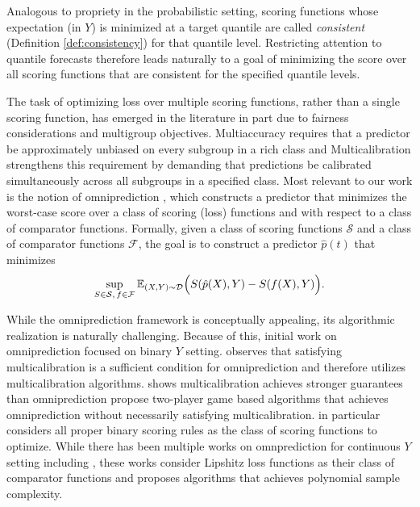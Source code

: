 Analogous to propriety in the probabilistic setting, scoring functions whose expectation (in $Y$) is minimized at a target quantile are called \emph{consistent} (Definition \ref{def:consistency}) for that quantile level. Restricting attention to quantile forecasts therefore leads naturally to a goal of minimizing the score over all scoring functions that are consistent for the specified quantile levels.

The task of optimizing loss over multiple scoring functions, rather than a single scoring function, has emerged in the literature in part due to fairness considerations and multigroup objectives. Multiaccuracy \cite{hebert2018multicalibration, kim2019multiaccuracy} requires that a predictor be approximately unbiased on every subgroup in a rich class and 
Multicalibration \cite{hebert2018multicalibration} strengthens this requirement by demanding that predictions be calibrated simultaneously across all subgroups in a specified class. Most relevant to our work is the notion of omniprediction \cite{gopalan2022omnipredictors}, which constructs a predictor that minimizes the worst-case score over a class of scoring (loss) functions and with respect to a class of comparator functions. Formally, given a class of scoring functions $\mathcal{S}$ and a class of comparator functions $\mathcal{F}$, the goal is to construct a predictor $\hat{p}(t)$ that minimizes
\begin{align}\label{eq:omni_objective}
    \sup_{S \in \mathcal{S},\, f \in \mathcal{F}} 
    \mathbb{E}_{(X,Y) \sim \mathcal{D}} \Big( S(\hat{p}(X), Y) - S(f(X), Y) \Big).    
\end{align}

While the omniprediction framework is conceptually appealing, its algorithmic realization is naturally challenging. Because of this, initial work on omniprediction focused on binary $Y$ setting. \cite{gopalan2022omnipredictors, gopalan2023loss, garg2024oracle, okoroafor2025near} observes that satisfying multicalibration is a sufficient condition for omniprediction and therefore utilizes multicalibration algorithms. \cite{gopalan2023swap} shows multicalibration achieves stronger guarantees than omniprediction \cite{garg2024oracle, isaac2025omni} propose two-player game based algorithms that achieves omniprediction without necessarily satisfying multicalibration. \cite{isaac2025omni} in particular considers all proper binary scoring rules as the class of scoring functions to optimize. While there has been multiple works on omnprediction for continuous $Y$ setting including \cite{gopalan2024omni_regression, lu2025omni_nonlinear}, these works consider Lipshitz loss functions as their class of comparator functions and proposes algorithms that achieves polynomial sample complexity.



